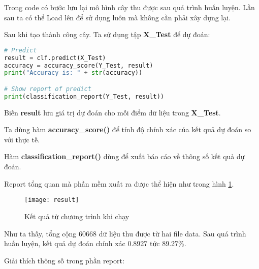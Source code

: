 \documentclass[../main-report.tex]{subfiles}
\begin{document}
Trong code có bước lưu lại mô hình cây thu được sau quá trình huấn luyện. Lần sau ta có thể Load lên để sử dụng luôn mà không cần phải xây dựng lại.

Sau khi tạo thành công cây. Ta sử dụng tập \textbf{X\_Test} để dự đoán:

\begin{lstlisting}[language=Python]
# Predict
result = clf.predict(X_Test)
accuracy = accuracy_score(Y_Test, result)
print("Accuracy is: " + str(accuracy))

# Show report of predict
print(classification_report(Y_Test, result))
\end{lstlisting}

Biến \textbf{result} lưu giá trị dự đoán cho mỗi điểm dữ liệu trong \textbf{X\_Test}.

Ta dùng hàm \textbf{accuracy\_score()} để tính độ chính xác của kết quả dự đoán so với thực tế.

Hàm \textbf{classification\_report()} dùng để xuất báo cáo về thông số kết quả dự đoán. 

Report tổng quan mà phần mềm xuất ra được thể hiện như trong hình \ref{fig:result}.

\begin{figure}[ht!]
\centering\texttt{[image: result]}
\caption{Kết quả từ chương trình khi chạy}
\label{fig:result}
\end{figure}

Như ta thấy, tổng cộng 60668 dữ liệu thu được từ hai file data. Sau quá trình huấn luyện, kết quả dự đoán chính xác 0.8927 tức 89.27\%.

Giải thích thông số trong phần report:
\end{document}
